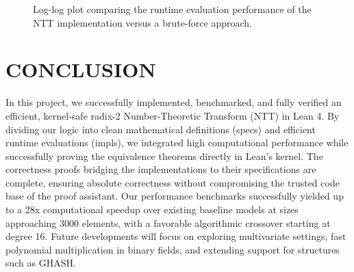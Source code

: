 \documentclass[a4paper,12pt]{report}
\begin{document}
\begin{figure}[h]
    \centering
    \caption{Log-log plot comparing the runtime evaluation performance of the NTT implementation versus a brute-force approach.}
    \label{fig:benchmark_plot}
\end{figure}
\newpage

\chapter{CONCLUSION}
In this project, we successfully implemented, benchmarked, and fully verified an efficient, kernel-safe radix-2 Number-Theoretic Transform (NTT) in Lean 4. By dividing our logic into clean mathematical definitions (specs) and efficient runtime evaluations (impls), we integrated high computational performance while successfully proving the equivalence theorems directly in Lean's kernel. The correctness proofs bridging the implementations to their specifications are complete, ensuring absolute correctness without compromising the trusted code base of the proof assistant. Our performance benchmarks successfully yielded up to a 28x computational speedup over existing baseline models at sizes approaching 3000 elements, with a favorable algorithmic crossover starting at degree 16. Future developments will focus on exploring multivariate settings, fast polynomial multiplication in binary fields, and extending support for structures such as GHASH.
\end{document}
